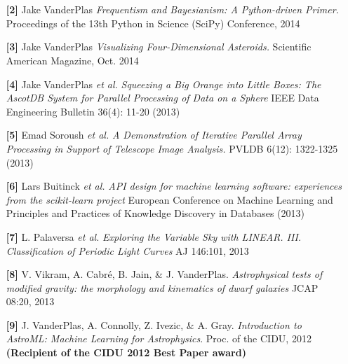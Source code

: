 \documentclass{article} %
\def\bf{\bfseries}
\def\sf{\sffamily}
\def\sl{\slshape}
\newlength\sidebarwidth
\newcommand{\subtopic}[3][]
	 {\begin{minipage}{\textwidth}
	 \vspace*{.4\baselineskip}
         \nopagebreak\hspace{0in}%
         \nopagebreak\begin{minipage}[t]{\sidebarwidth - .2cm}
         \raggedleft {\sf\fontseries{sbc}\selectfont #2}
         {\\[-0.2\baselineskip] \textcolor{gray}{\footnotesize #1}}
	 \end{minipage}%
	 \hfill
	 \begin{minipage}[t]{\linewidth - \sidebarwidth}
	 #3%
	 \end{minipage}%
	 \vspace*{.2\baselineskip plus 1\baselineskip minus
	 .2\baselineskip}%
	 \end{minipage}}
\begin{document}
\subtopic{\hspace*{-3ex} Articles}{~ 
  \begin{itemize}[leftmargin=0ex, itemsep=0ex, parsep=.5ex, labelindent=-4ex]

    \item[{\bf \textcolor{myblue}{[2]}}]
      Jake VanderPlas
      {\it Frequentism and Bayesianism: A Python-driven Primer.}
      Proceedings of the 13th Python in Science (SciPy) Conference, 2014

    \item[{\bf \textcolor{myblue}{[3]}}]
      Jake VanderPlas
      {\it Visualizing Four-Dimensional Asteroids.}
      Scientific American Magazine, Oct. 2014

    \item[{\bf \textcolor{myblue}{[4]}}]
      Jake VanderPlas {\it et al.}
      {\it Squeezing a Big Orange into Little Boxes: The AscotDB System
        for Parallel Processing of Data on a Sphere}
      IEEE Data Engineering Bulletin 36(4): 11-20 (2013)

    \item[{\bf \textcolor{myblue}{[5]}}]
      Emad Soroush {\it et al.}
      {\it A Demonstration of Iterative Parallel Array Processing in Support
        of Telescope Image Analysis.}
      PVLDB 6(12): 1322-1325 (2013)

    \item[{\bf \textcolor{myblue}{[6]}}]
      Lars Buitinck {\it et al.}
      {\it API design for machine learning software:
        experiences from the scikit-learn project}
      European Conference on Machine Learning and Principles and Practices
      of Knowledge Discovery in Databases (2013)

    \item[{\bf \textcolor{myblue}{[7]}}]
      L. Palaversa {\sl et al.}
      {\sl Exploring the Variable Sky with LINEAR. III.
        Classification of Periodic Light Curves}
      AJ 146:101, 2013

    \item[{\bf \textcolor{myblue}{[8]}}]
      V. Vikram, A. Cabr\'{e}, B. Jain, \& J. VanderPlas.
      {\it Astrophysical tests of modified gravity:
        the morphology and kinematics of dwarf galaxies}
      JCAP 08:20, 2013
 
    \item[{\bf \textcolor{myblue}{[9]}}]
      J. VanderPlas, A. Connolly, Z. Ivezic, \& A. Gray.
      {\sl Introduction to AstroML: Machine Learning for Astrophysics}.
      Proc. of the CIDU, 2012
      {\bf (Recipient of the CIDU 2012 Best Paper award)}


\end{itemize}}
\end{document}

